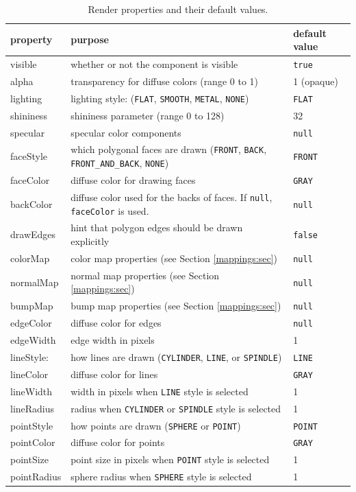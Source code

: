 \begin{table}[h]
\begin{center}
\begin{tabular}{|lll|}
\hline property & purpose & default value \\ \hline
visible & whether or not the component is visible & {\tt true} \\
alpha & transparency for diffuse colors (range 0 to 1) & 1 (opaque) \\
lighting & lighting style:
({\tt FLAT}, {\tt SMOOTH}, {\tt METAL}, {\tt NONE}) & {\tt FLAT}\\
shininess & shininess parameter (range 0 to 128) & 32 \\
specular & specular color components & {\tt null} \\
\hline
faceStyle &
which polygonal faces are drawn ({\tt FRONT}, {\tt BACK},
{\tt FRONT\_AND\_BACK}, {\tt NONE}) & {\tt FRONT} \\
faceColor &
diffuse color for drawing faces & {\tt GRAY} \\
backColor &
diffuse color used for the backs of faces.
If {\tt null}, {\tt faceColor} is used. & {\tt null} \\
drawEdges & hint that polygon edges should be drawn explicitly & {\tt false} \\
\hline
colorMap & 
color map properties (see Section \ref{mappings:sec})& {\tt null}\\
normalMap & 
normal map properties (see Section \ref{mappings:sec})& {\tt null}\\
bumpMap & 
bump map properties (see Section \ref{mappings:sec})& {\tt null}\\
\hline
edgeColor & diffuse color for edges & {\tt null} \\
edgeWidth & edge width in pixels & 1 \\
\hline
lineStyle: &
how lines are drawn ({\tt CYLINDER}, {\tt LINE}, or {\tt SPINDLE}) & 
{\tt LINE} \\
lineColor & diffuse color for lines & {\tt GRAY} \\
lineWidth & width in pixels when {\tt LINE} style is selected & 1 \\
lineRadius & radius when {\tt CYLINDER} or {\tt SPINDLE} style is selected &
1 \\
\hline
pointStyle & how points are drawn ({\tt SPHERE} or {\tt POINT}) & {\tt POINT} \\
pointColor & diffuse color for points & {\tt GRAY} \\
pointSize & point size in pixels when {\tt POINT} style is selected & 1 \\
pointRadius & sphere radius when {\tt SPHERE} style is selected & 1 \\
\hline
\end{tabular}
\end{center}
\caption{Render properties and their default values.}
\label{RenderProps:tab}
\end{table}

